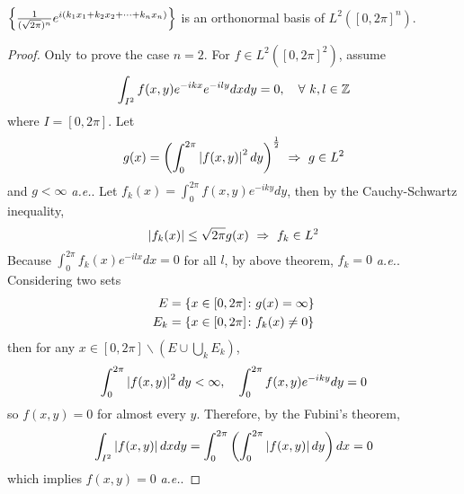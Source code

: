 \begin{enumerate}[label=\arabic*.]
	\begin{thm}
		$\left\{\frac{1}{(\sqrt{2\pi})^n}e^{i(k_1x_1+k_2x_2+\cdots+k_nx_n)}\right\}$ is an orthonormal basis of $L^2([0,2\pi]^n)$.
	\end{thm}
	\begin{proof}
		Only to prove the case $n=2$. For $f \in L^2([0,2\pi]^2)$, assume
		\begin{equation*}
			\int_{I^2} f(x,y)e^{-ikx}e^{-ily}dxdy = 0,\quad \forall~k,l\in \mathbb{Z}
		\end{equation*}
		where $I = [0,2\pi]$. Let
		\begin{equation*}
			g(x) = \left(\int_0^{2\pi}\left\lvert f(x,y)\right\lvert^2dy\right)^{\frac{1}{2}}~\Rightarrow~g \in L^2
		\end{equation*}	
		and $g < \infty$ \emph{a.e.}. Let $f_k(x) = \int_0^{2\pi} f(x,y)e^{-iky}dy$, then by the Cauchy-Schwartz inequality,
		\begin{equation*}
			\left\lvert f_k(x)\right\lvert \leq \sqrt{2\pi}g(x)~\Rightarrow~f_k \in L^2
		\end{equation*}
		Because $\int_0^{2\pi}f_k(x)e^{-ilx}dx = 0$ for all $l$, by above theorem, $f_k = 0$ \emph{a.e.}. Considering two sets
		\begin{equation*}
			\begin{aligned}
				E &= \left\{x \in [0,2\pi] \colon g(x) = \infty\right\} \\
				E_k &= \left\{x \in [0,2\pi] \colon f_k(x) \neq 0\right\}
			\end{aligned}
		\end{equation*}
		then for any $x \in [0,2\pi] \backslash (E \cup \bigcup_k E_k)$,
		\begin{equation*}
			\int_0^{2\pi}\left\lvert f(x,y)\right\lvert^2dy < \infty,\quad \int_0^{2\pi} f(x,y)e^{-iky}dy = 0
		\end{equation*}
		so $f(x,y) = 0$ for almost every $y$. Therefore, by the Fubini's theorem,
		\begin{equation*}
			\int_{I^2} \left\lvert f(x,y)\right\lvert dxdy = \int_0^{2\pi} \left(\int_0^{2\pi}\left\lvert f(x,y)\right\lvert dy\right)dx = 0
		\end{equation*}
		which implies $f(x,y) = 0$ \emph{a.e.}.
	\end{proof}


\end{enumerate}
